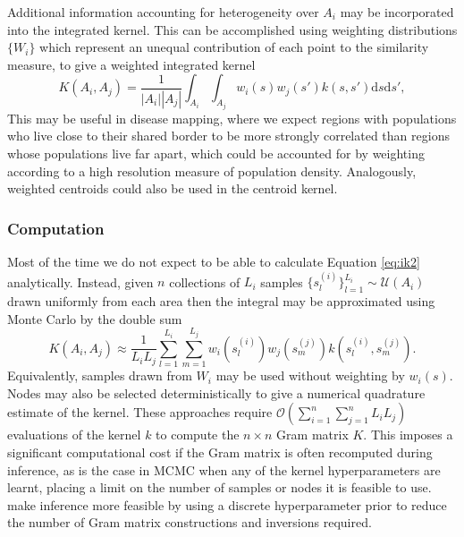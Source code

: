 \documentclass[a4paper, nobind]{templates/ociamthesis}
\begin{document}
Additional information accounting for heterogeneity over \(A_i\) may be incorporated into the integrated kernel.
This can be accomplished using weighting distributions \(\{W_i\}\) which represent an unequal contribution of each point to the similarity measure, to give a weighted integrated kernel
\begin{equation}
  K(A_i, A_j) = \frac{1}{|A_i||A_j|}\int_{A_i} \int_{A_j} w_i(s) w_j(s') k(s, s') \text{d} s \text{d} s', \label{eq:ik2}
\end{equation}
This may be useful in disease mapping, where we expect regions with populations who live close to their shared border to be more strongly correlated than regions whose populations live far apart, which could be accounted for by weighting according to a high resolution measure of population density.
Analogously, weighted centroids could also be used in the centroid kernel.

\hypertarget{computation}{%
\subsubsection{Computation}\label{computation}}

Most of the time we do not expect to be able to calculate Equation \eqref{eq:ik2} analytically.
Instead, given \(n\) collections of \(L_i\) samples \(\{s^{(i)}_l \}_{l = 1}^{L_i} \sim \mathcal{U}(A_i)\) drawn uniformly from each area then the integral may be approximated using Monte Carlo by the double sum
\begin{equation}
  K(A_i, A_j) \approx \frac{1}{L_i L_j} \sum_{l = 1}^{L_i} \sum_{m = 1}^{L_j}
  w_i \left( s^{(i)}_l \right) w_j \left( s^{(j)}_m \right)
  k \left( s^{(i)}_l, s^{(j)}_m \right). \label{eq:mcintegratedkernel}
\end{equation}
Equivalently, samples drawn from \(W_i\) may be used without weighting by \(w_i(s)\).
Nodes may also be selected deterministically to give a numerical quadrature estimate of the kernel.
These approaches require \(\mathcal{O}(\sum_{i = 1}^n \sum_{j = 1}^n L_i L_j)\) evaluations of the kernel \(k\) to compute the \(n \times n\) Gram matrix \(K\).
This imposes a significant computational cost if the Gram matrix is often recomputed during inference, as is the case in MCMC when any of the kernel hyperparameters are learnt, placing a limit on the number of samples or nodes it is feasible to use.
\textcite{kelsall2002modeling} make inference more feasible by using a discrete hyperparameter prior to reduce the number of Gram matrix constructions and inversions required.
\end{document}
